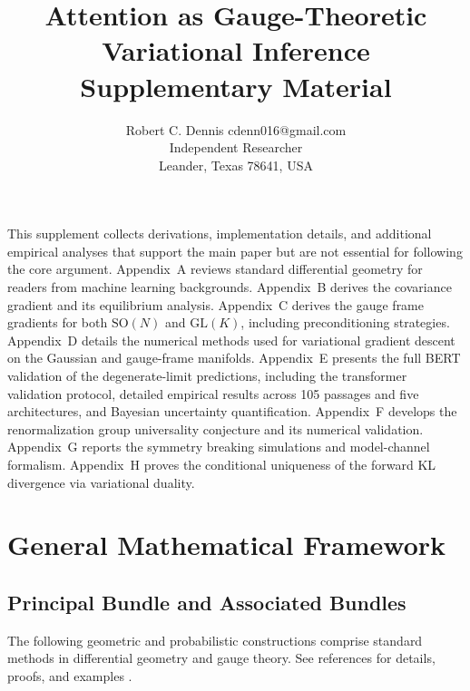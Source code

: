 \documentclass[twoside,11pt]{article}
\begin{document}

\title{Attention as Gauge-Theoretic Variational Inference\\[6pt]
\large Supplementary Material}

\author{\name Robert C. Dennis \email cdenn016@gmail.com \\
  \addr Independent Researcher\\
  \addr Leander, Texas 78641, USA}


\maketitle


This supplement collects derivations, implementation details, and additional empirical analyses that support the main paper but are not essential for following the core argument. Appendix~A reviews standard differential geometry for readers from machine learning backgrounds. Appendix~B derives the covariance gradient and its equilibrium analysis. Appendix~C derives the gauge frame gradients for both $\mathrm{SO}(N)$ and $\mathrm{GL}(K)$, including preconditioning strategies. Appendix~D details the numerical methods used for variational gradient descent on the Gaussian and gauge-frame manifolds. Appendix~E presents the full BERT validation of the degenerate-limit predictions, including the transformer validation protocol, detailed empirical results across 105 passages and five architectures, and Bayesian uncertainty quantification. Appendix~F develops the renormalization group universality conjecture and its numerical validation. Appendix~G reports the symmetry breaking simulations and model-channel formalism. Appendix~H proves the conditional uniqueness of the forward KL divergence via variational duality.

\appendix

\section{General Mathematical Framework}
\subsection{Principal Bundle and Associated Bundles}

The following geometric and probabilistic constructions comprise standard methods in differential geometry and gauge theory. See references for details, proofs, and examples \citep{nakahara2003geometry,frankel2011geometry,blei2017variational,amari2016information}.
\end{document}
